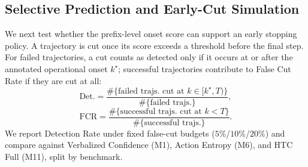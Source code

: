 %
%
%

\subsection{Selective Prediction and Early-Cut Simulation}
\label{subsec:early_cut}

We next test whether the prefix-level onset score can support an early
stopping policy. A trajectory is cut once its score exceeds a threshold
before the final step. For failed trajectories, a cut counts as detected
only if it occurs at or after the annotated operational onset \(k^\star\);
successful trajectories contribute to False Cut Rate if they are cut at
all:
\begin{equation}
\mathrm{Det.} =
\frac{\#\{\text{failed trajs. cut at } k \in [k^\star, T)\}}
{\#\{\text{failed trajs.}\}},
\end{equation}
\begin{equation}
\mathrm{FCR} =
\frac{\#\{\text{successful trajs. cut at } k < T\}}
{\#\{\text{successful trajs.}\}}.
\end{equation}
We report Detection Rate under fixed false-cut budgets (\(5\%\)/\(10\%\)/\(20\%\))
and compare against Verbalized Confidence (M1), Action Entropy (M6), and
HTC Full (M11), split by benchmark.

